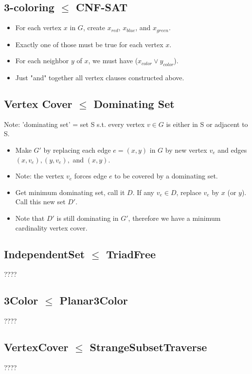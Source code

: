 \documentclass[12pt]{article}
\providecommand{\reducible}[2]{
  \textbf{#1} $\leq$ \textbf{#2}
}
\begin{document}
\subsection{\reducible{3-coloring}{CNF-SAT}}
\begin{itemize}
  \item For each vertex $x$ in $G$, create $x_{red}$, $x_{blue}$, and $x_{green}$.
  \item Exactly one of those must be true for each vertex $x$.
  \item For each neighbor $y$ of $x$, we must have ($x_{color} \lor y_{color}$).
  \item Just "and" together all vertex clauses constructed above.
\end{itemize}

\subsection{\reducible{Vertex Cover}{Dominating Set}}
Note: 'dominating set' = set S s.t. every vertex $v \in G$ is either in S or adjacent to S.
\begin{itemize}
  \item Make $G'$ by replacing each edge $e = (x,y)$ in $G$ by new vertex $v_e$ and edges $(x,v_e),(y,v_e),$ and $(x,y)$.
  \item Note: the vertex $v_e$ forces edge $e$ to be covered by a dominating set.
  \item Get minimum dominating set, call it $D$. If any $v_e \in D$, replace $v_e$ by $x$ (or $y$). Call this new set $D'$.
  \item Note that $D'$ is still dominating in $G'$, therefore we have a minimum cardinality vertex cover.
\end{itemize}


\subsection{\reducible{IndependentSet}{TriadFree}}
????


\subsection{\reducible{3Color}{Planar3Color}}
????


\subsection{\reducible{VertexCover}{StrangeSubsetTraverse}}
????
\end{document}
